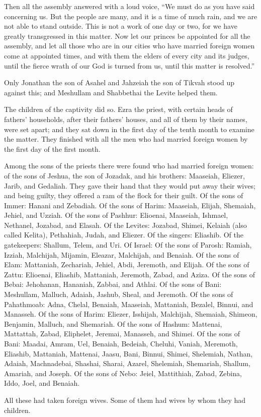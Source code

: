  Then all the assembly answered with a loud voice, ``We
must do as you have said concerning us.  But the people are
many, and it is a time of much rain, and we are not able to stand
outside. This is not a work of one day or two, for we have greatly
transgressed in this matter.  Now let our princes be
appointed for all the assembly, and let all those who are in our cities
who have married foreign women come at appointed times, and with them
the elders of every city and its judges, until the fierce wrath of our
God is turned from us, until this matter is resolved.''

 Only Jonathan the son of Asahel and Jahzeiah the son of
Tikvah stood up against this; and Meshullam and Shabbethai the Levite
helped them.

 The children of the captivity did so. Ezra the priest,
with certain heads of fathers' households, after their fathers' houses,
and all of them by their names, were set apart; and they sat down in the
first day of the tenth month to examine the matter.  They
finished with all the men who had married foreign women by the first day
of the first month.

 Among the sons of the priests there were found who had
married foreign women: of the sons of Jeshua, the son of Jozadak, and
his brothers: Maaseiah, Eliezer, Jarib, and Gedaliah.  They
gave their hand that they would put away their wives; and being guilty,
they offered a ram of the flock for their guilt.  Of the
sons of Immer: Hanani and Zebadiah.  Of the sons of Harim:
Maaseiah, Elijah, Shemaiah, Jehiel, and Uzziah.  Of the
sons of Pashhur: Elioenai, Maaseiah, Ishmael, Nethanel, Jozabad, and
Elasah.  Of the Levites: Jozabad, Shimei, Kelaiah (also
called Kelita), Pethahiah, Judah, and Eliezer.  Of the
singers: Eliashib. Of the gatekeepers: Shallum, Telem, and Uri.
 Of Israel: Of the sons of Parosh: Ramiah, Izziah,
Malchijah, Mijamin, Eleazar, Malchijah, and Benaiah.  Of
the sons of Elam: Mattaniah, Zechariah, Jehiel, Abdi, Jeremoth, and
Elijah.  Of the sons of Zattu: Elioenai, Eliashib,
Mattaniah, Jeremoth, Zabad, and Aziza.  Of the sons of
Bebai: Jehohanan, Hananiah, Zabbai, and Athlai.  Of the
sons of Bani: Meshullam, Malluch, Adaiah, Jashub, Sheal, and Jeremoth.
 Of the sons of Pahathmoab: Adna, Chelal, Benaiah,
Maaseiah, Mattaniah, Bezalel, Binnui, and Manasseh.  Of the
sons of Harim: Eliezer, Isshijah, Malchijah, Shemaiah, Shimeon,
 Benjamin, Malluch, and Shemariah.  Of the
sons of Hashum: Mattenai, Mattattah, Zabad, Eliphelet, Jeremai,
Manasseh, and Shimei.  Of the sons of Bani: Maadai, Amram,
Uel,  Benaiah, Bedeiah, Cheluhi,  Vaniah,
Meremoth, Eliashib,  Mattaniah, Mattenai, Jaasu,
 Bani, Binnui, Shimei,  Shelemiah, Nathan,
Adaiah,  Machnadebai, Shashai, Sharai, 
Azarel, Shelemiah, Shemariah,  Shallum, Amariah, and
Joseph.  Of the sons of Nebo: Jeiel, Mattithiah, Zabad,
Zebina, Iddo, Joel, and Benaiah.

 All these had taken foreign wives. Some of them had wives
by whom they had children.

